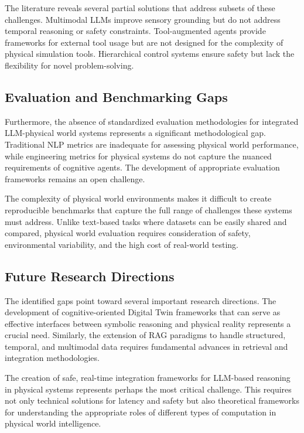 The literature reveals several partial solutions that address subsets of these challenges. Multimodal LLMs improve sensory grounding but do not address temporal reasoning or safety constraints. Tool-augmented agents provide frameworks for external tool usage but are not designed for the complexity of physical simulation tools. Hierarchical control systems ensure safety but lack the flexibility for novel problem-solving.

\subsection{Evaluation and Benchmarking Gaps}

Furthermore, the absence of standardized evaluation methodologies for integrated LLM-physical world systems represents a significant methodological gap. Traditional NLP metrics are inadequate for assessing physical world performance, while engineering metrics for physical systems do not capture the nuanced requirements of cognitive agents. The development of appropriate evaluation frameworks remains an open challenge.

The complexity of physical world environments makes it difficult to create reproducible benchmarks that capture the full range of challenges these systems must address. Unlike text-based tasks where datasets can be easily shared and compared, physical world evaluation requires consideration of safety, environmental variability, and the high cost of real-world testing.

\subsection{Future Research Directions}

The identified gaps point toward several important research directions. The development of cognitive-oriented Digital Twin frameworks that can serve as effective interfaces between symbolic reasoning and physical reality represents a crucial need. Similarly, the extension of RAG paradigms to handle structured, temporal, and multimodal data requires fundamental advances in retrieval and integration methodologies.

The creation of safe, real-time integration frameworks for LLM-based reasoning in physical systems represents perhaps the most critical challenge. This requires not only technical solutions for latency and safety but also theoretical frameworks for understanding the appropriate roles of different types of computation in physical world intelligence.


